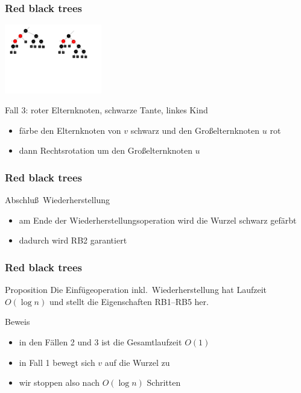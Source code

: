 \documentclass[aspectratio=1610, 11pt]{beamer}
\newcommand{\mytitle}{Red black trees}
\begin{document}
\begin{frame}\frametitle{\mytitle}
	\includegraphics[height=30mm]{./images/redblack_insert2a.pdf}\hfill\includegraphics[height=30mm]{./images/redblack_insert3a.pdf}
	\begin{exampleblock}{Fall 3: roter Elternknoten, schwarze Tante, linkes Kind}
		\begin{itemize}
			\item f\"arbe den Elternknoten von $v$ schwarz und den Gro\ss elternknoten $u$ rot
			\item dann Rechtsrotation um den Gro\ss elternknoten $u$
		\end{itemize}
	\end{exampleblock}
\end{frame}

\begin{frame}\frametitle{\mytitle}
	\begin{exampleblock}{Abschlu\ss\ Wiederherstellung}
		\begin{itemize}
			\item am Ende der Wiederherstellungsoperation wird die Wurzel schwarz gef\"arbt
			\item dadurch wird RB2 garantiert
		\end{itemize}
	\end{exampleblock}
\end{frame}

\begin{frame}\frametitle{\mytitle}
	\begin{block}{Proposition}
Die Einf\"ugeoperation inkl.\ Wiederherstellung hat Laufzeit $O(\log n)$ und stellt die Eigenschaften RB1--RB5 her.
	\end{block}
\begin{exampleblock}{Beweis}
		\begin{itemize}
			\item in den F\"allen 2 und 3 ist die Gesamtlaufzeit $O(1)$
			\item in Fall 1 bewegt sich $v$ auf die Wurzel zu
			\item wir stoppen also nach $O(\log n)$ Schritten
		\end{itemize}
	\end{exampleblock}
\end{frame}
\end{document}

